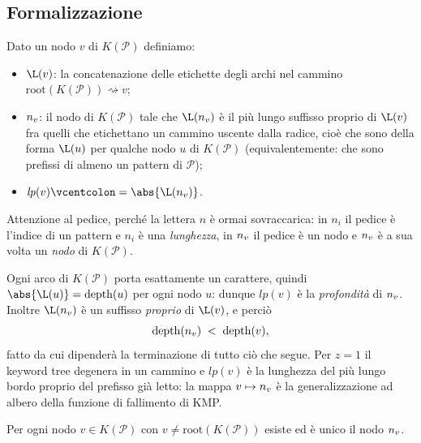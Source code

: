 \subsection{Formalizzazione}


\begin{definizione}\label{def:ac-failure-node}
Dato un nodo $v$ di $K(\mathcal{P})$ definiamo:
\begin{itemize}
  \item $\L(v)$: la concatenazione delle etichette degli archi nel cammino
        $\mathrm{root}(K(\mathcal{P})) \rightsquigarrow v$;
  \item $n_{v}$: il nodo di $K(\mathcal{P})$ tale che $\L(\nv{v})$ è il più lungo suffisso
        proprio di $\L(v)$ fra quelli che etichettano un cammino uscente dalla radice, cioè
        che sono della forma $\L(u)$ per qualche nodo $u$ di $K(\mathcal{P})$
        (equivalentemente: che sono prefissi di almeno un pattern di $\mathcal{P}$);
  \item $\mathit{lp}(v) \defeq \abs{\L(\nv{v})}$.
\end{itemize}
\end{definizione}

\begin{osservazione}
Attenzione al pedice, perché la lettera $n$ è ormai sovraccarica: in $n_i$ il pedice è
l'indice di un pattern e $n_i$ è una \emph{lunghezza}, in $n_{v}$ il pedice è un nodo e
$n_{v}$ è a sua volta un \emph{nodo} di $K(\mathcal{P})$.

Ogni arco di $K(\mathcal{P})$ porta esattamente un carattere, quindi
$\abs{\L(u)} = \mathrm{depth}(u)$ per ogni nodo $u$: dunque $\mathit{lp}(v)$ è la
\emph{profondità} di $n_{v}$. Inoltre $\L(\nv{v})$ è un suffisso \emph{proprio} di $\L(v)$,
e perciò
\[
  \mathrm{depth}(n_{v}) \;<\; \mathrm{depth}(v),
\]
fatto da cui dipenderà la terminazione di tutto ciò che segue. Per $z = 1$ il keyword tree
degenera in un cammino e $\mathit{lp}(v)$ è la lunghezza del più lungo bordo proprio del
prefisso già letto: la mappa $v \mapsto n_{v}$ è la generalizzazione ad albero della
funzione di fallimento di KMP.
\end{osservazione}

\begin{lemma}\label{lem:ac-nv}
Per ogni nodo $v \in K(\mathcal{P})$ con $v \neq \mathrm{root}(K(\mathcal{P}))$ esiste ed è
unico il nodo $n_{v}$.
\end{lemma}

